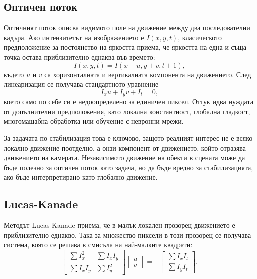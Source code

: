 \documentclass[12pt,a4paper]{article}
\begin{document}
\subsection{Оптичен поток}
Оптичният поток описва видимото поле на движение между два последователни кадъра. Ако интензитетът на изображението е \(I(x,y,t)\), класическото предположение за постоянство на яркостта приема, че яркостта на една и съща точка остава приблизително еднаква във времето:
\begin{equation}
I(x,y,t) = I(x+u, y+v, t+1),
\end{equation}
където \(u\) и \(v\) са хоризонталната и вертикалната компонента на движението. След линеаризация се получава стандартното уравнение
\begin{equation}
I_x u + I_y v + I_t = 0,
\end{equation}
което само по себе си е недоопределено за единичен пиксел. Оттук идва нуждата от допълнителни предположения, като локална константност, глобална гладкост, многомащабна обработка или обучение с невронни мрежи.

За задачата по стабилизация това е ключово, защото реалният интерес не е всяко локално движение поотделно, а онзи компонент от движението, който отразява движението на камерата. Независимото движение на обекти в сцената може да бъде полезно за оптичен поток като задача, но да бъде вредно за стабилизацията, ако бъде интерпретирано като глобално движение.

\subsection{Lucas-Kanade}
Методът Lucas-Kanade приема, че в малък локален прозорец движението е приблизително еднакво. Така за множество пиксели в този прозорец се получава система, която се решава в смисъла на най-малките квадрати:
\begin{equation}
\begin{bmatrix}
\sum I_x^2 & \sum I_x I_y \\
\sum I_x I_y & \sum I_y^2
\end{bmatrix}
\begin{bmatrix}
u \\ v
\end{bmatrix}
=
-
\begin{bmatrix}
\sum I_x I_t \\
\sum I_y I_t
\end{bmatrix}.
\end{equation}
\end{document}
